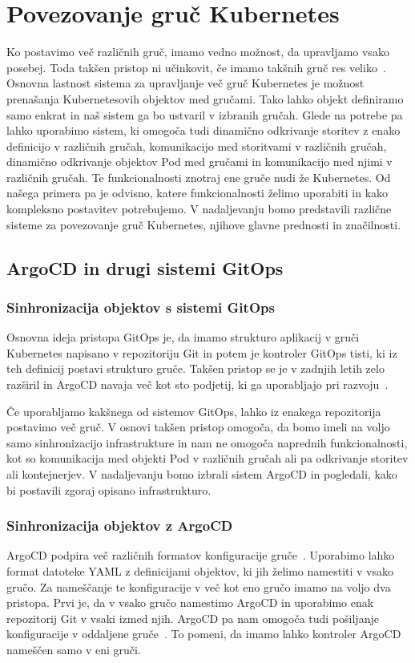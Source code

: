 \documentclass[a4paper, 12pt]{book}
\begin{document}
\chapter{Povezovanje gruč Kubernetes}
Ko postavimo več različnih gruč, imamo vedno možnost, da upravljamo vsako posebej.
Toda takšen pristop ni učinkovit, če imamo takšnih gruč res veliko~\cite{difference-multi-cluster}.
Osnovna lastnost sistema za upravljanje več gruč Kubernetes je možnost prenašanja Kubernetesovih objektov med gručami.
Tako lahko objekt definiramo samo enkrat in naš sistem ga bo ustvaril v izbranih gručah.
Glede na potrebe pa lahko uporabimo sistem, ki omogoča tudi dinamično odkrivanje storitev z enako definicijo v različnih gručah, komunikacijo med storitvami v različnih gručah, dinamično odkrivanje objektov Pod med gručami in komunikacijo med njimi v različnih gručah.
Te funkcionalnosti znotraj ene gruče nudi že Kubernetes.
Od našega primera pa je odvisno, katere funkcionalnosti želimo uporabiti in kako kompleksno postavitev potrebujemo.
V nadaljevanju bomo predstavili različne sisteme za povezovanje gruč Kubernetes, njihove glavne prednosti in značilnosti.
\section{ArgoCD in drugi sistemi GitOps}
\subsection{Sinhronizacija objektov s sistemi GitOps}
Osnovna ideja pristopa GitOps je, da imamo strukturo aplikacij v gruči Kubernetes napisano v repozitoriju Git in potem je kontroler GitOps tisti, ki iz teh definicij postavi strukturo gruče.
Takšen pristop se je v zadnjih letih zelo razširil in ArgoCD navaja več kot sto podjetij, ki ga uporabljajo pri razvoju~\cite{argocd-user-list}.

Če uporabljamo kakšnega od sistemov GitOps, lahko iz enakega repozitorija postavimo več gruč.
V osnovi takšen pristop omogoča, da bomo imeli na voljo samo sinhronizacijo infrastrukture in nam ne omogoča naprednih funkcionalnosti, kot so komunikacija med objekti Pod v različnih gručah ali pa odkrivanje storitev ali kontejnerjev.
V nadaljevanju bomo izbrali sistem ArgoCD in pogledali, kako bi postavili zgoraj opisano infrastrukturo.
\subsection{Sinhronizacija objektov z ArgoCD}
ArgoCD podpira več različnih formatov konfiguracije gruče~\cite{argocd-docs}.
Uporabimo lahko format datoteke YAML z definicijami objektov, ki jih želimo namestiti v vsako gručo.
Za nameščanje te konfiguracije v več kot eno gručo imamo na voljo dva pristopa.
Prvi je, da v vsako gručo namestimo ArgoCD in uporabimo enak repozitorij Git v vsaki izmed njih.
ArgoCD pa nam omogoča tudi pošiljanje konfiguracije v oddaljene gruče~\cite{declarative-setup}.
To pomeni, da imamo lahko kontroler ArgoCD nameščen samo v eni gruči.
\end{document}
